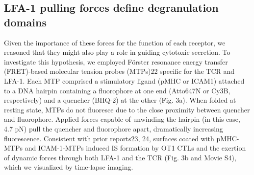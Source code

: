 \subsection{LFA-1 pulling forces define degranulation domains}
Given the importance of these forces for the function of each receptor, we reasoned that they might also play a role in guiding cytotoxic secretion. To investigate this hypothesis, we employed F\"{o}rster resonance energy transfer (FRET)-based molecular tension probes (MTPs)22 specific for the TCR and LFA-1. Each MTP comprised a stimulatory ligand (pMHC or ICAM1) attached to a DNA hairpin containing a fluorophore at one end (Atto647N or Cy3B, respectively) and a quencher (BHQ-2) at the other (Fig. 3a). When folded at resting state, MTPs do not fluoresce due to the close proximity between quencher and fluorophore. Applied forces capable of unwinding the hairpin (in this case, 4.7 pN) pull the quencher and fluorophore apart, dramatically increasing fluorescence. Consistent with prior reports23, 24, surfaces coated with pMHC-MTPs and ICAM-1-MTPs induced IS formation by OT1 CTLs and the exertion of dynamic forces through both LFA-1 and the TCR (Fig. 3b and Movie S4), which we visualized by time-lapse imaging. 


